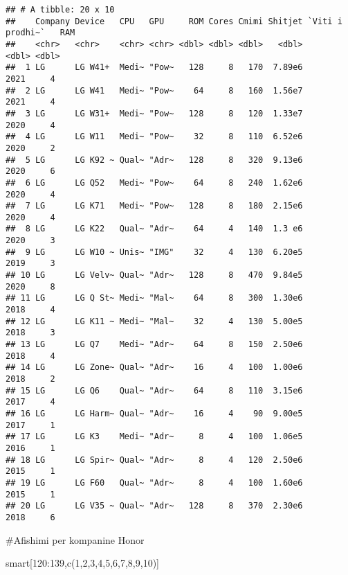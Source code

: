 \documentclass[
]{article}
\newenvironment{Shaded}{\begin{snugshade}}{\end{snugshade}}
\newcommand{\DecValTok}[1]{\textcolor[rgb]{0.00,0.00,0.81}{#1}}
\newcommand{\FunctionTok}[1]{\textcolor[rgb]{0.00,0.00,0.00}{#1}}
\newcommand{\NormalTok}[1]{#1}
\newcommand{\SpecialCharTok}[1]{\textcolor[rgb]{0.00,0.00,0.00}{#1}}
\begin{document}
\begin{verbatim}
## # A tibble: 20 x 10
##    Company Device   CPU   GPU     ROM Cores Cmimi Shitjet `Viti i prodhi~`   RAM
##    <chr>   <chr>    <chr> <chr> <dbl> <dbl> <dbl>   <dbl>            <dbl> <dbl>
##  1 LG      LG W41+  Medi~ "Pow~   128     8   170  7.89e6             2021     4
##  2 LG      LG W41   Medi~ "Pow~    64     8   160  1.56e7             2021     4
##  3 LG      LG W31+  Medi~ "Pow~   128     8   120  1.33e7             2020     4
##  4 LG      LG W11   Medi~ "Pow~    32     8   110  6.52e6             2020     2
##  5 LG      LG K92 ~ Qual~ "Adr~   128     8   320  9.13e6             2020     6
##  6 LG      LG Q52   Medi~ "Pow~    64     8   240  1.62e6             2020     4
##  7 LG      LG K71   Medi~ "Pow~   128     8   180  2.15e6             2020     4
##  8 LG      LG K22   Qual~ "Adr~    64     4   140  1.3 e6             2020     3
##  9 LG      LG W10 ~ Unis~ "IMG"    32     4   130  6.20e5             2019     3
## 10 LG      LG Velv~ Qual~ "Adr~   128     8   470  9.84e5             2020     8
## 11 LG      LG Q St~ Medi~ "Mal~    64     8   300  1.30e6             2018     4
## 12 LG      LG K11 ~ Medi~ "Mal~    32     4   130  5.00e5             2018     3
## 13 LG      LG Q7    Medi~ "Adr~    64     8   150  2.50e6             2018     4
## 14 LG      LG Zone~ Qual~ "Adr~    16     4   100  1.00e6             2018     2
## 15 LG      LG Q6    Qual~ "Adr~    64     8   110  3.15e6             2017     4
## 16 LG      LG Harm~ Qual~ "Adr~    16     4    90  9.00e5             2017     1
## 17 LG      LG K3    Medi~ "Adr~     8     4   100  1.06e5             2016     1
## 18 LG      LG Spir~ Qual~ "Adr~     8     4   120  2.50e6             2015     1
## 19 LG      LG F60   Qual~ "Adr~     8     4   100  1.60e6             2015     1
## 20 LG      LG V35 ~ Qual~ "Adr~   128     8   370  2.30e6             2018     6
\end{verbatim}

\#Afishimi per kompanine Honor

\begin{Shaded}
\begin{Highlighting}[]
\NormalTok{smart[}\DecValTok{120}\SpecialCharTok{:}\DecValTok{139}\NormalTok{,}\FunctionTok{c}\NormalTok{(}\DecValTok{1}\NormalTok{,}\DecValTok{2}\NormalTok{,}\DecValTok{3}\NormalTok{,}\DecValTok{4}\NormalTok{,}\DecValTok{5}\NormalTok{,}\DecValTok{6}\NormalTok{,}\DecValTok{7}\NormalTok{,}\DecValTok{8}\NormalTok{,}\DecValTok{9}\NormalTok{,}\DecValTok{10}\NormalTok{)]}
\end{Highlighting}
\end{Shaded}
\end{document}
